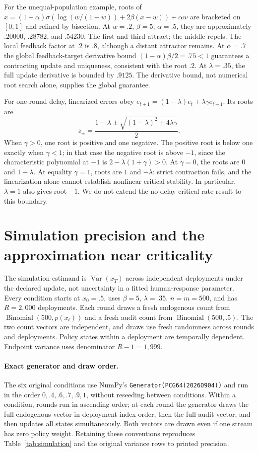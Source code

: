 For the unequal-population example, roots of $x=(1-\alpha)\sigma(\log(w/(1-w))+2\beta(x-w))+\alpha w$ are bracketed on $[0,1]$ and refined by bisection. At $w=.2$, $\beta=5$, $\alpha=.5$, they are approximately $.20000$, $.28782$, and $.54230$. The first and third attract; the middle repels. The local feedback factor at $.2$ is $.8$, although a distant attractor remains. At $\alpha=.7$ the global feedback-target derivative bound $(1-\alpha)\beta/2=.75<1$ guarantees a contracting update and uniqueness, consistent with the root $.2$. At $\lambda=.35$, the full update derivative is bounded by $.9125$. The derivative bound, not numerical root search alone, supplies the global guarantee.

For one-round delay, linearized errors obey $e_{t+1}=(1-\lambda)e_t+\lambda\gamma e_{t-1}$. Its roots are
\[
z_\pm=\frac{1-\lambda\pm\sqrt{(1-\lambda)^2+4\lambda\gamma}}{2}.
\]
When $\gamma>0$, one root is positive and one negative. The positive root is below one exactly when $\gamma<1$; in that case the negative root is above $-1$, since the characteristic polynomial at $-1$ is $2-\lambda(1+\gamma)>0$. At $\gamma=0$, the roots are $0$ and $1-\lambda$. At equality $\gamma=1$, roots are $1$ and $-\lambda$: strict contraction fails, and the linearization alone cannot establish nonlinear critical stability. In particular, $\lambda=1$ also gives root $-1$. We do not extend the no-delay critical-rate result to this boundary.

\section{Simulation precision and the approximation near criticality}\label{app:simulation}
The simulation estimand is $\operatorname{Var}(x_T)$ across independent deployments under the declared update, not uncertainty in a fitted human-response parameter. Every condition starts at $x_0=.5$, uses $\beta=5$, $\lambda=.35$, $n=m=500$, and has $R=2{,}000$ deployments. Each round draws a fresh endogenous count from $\operatorname{Binomial}(500,p(x_t))$ and a fresh audit count from $\operatorname{Binomial}(500,.5)$. The two count vectors are independent, and draws use fresh randomness across rounds and deployments. Policy states within a deployment are temporally dependent. Endpoint variance uses denominator $R-1=1{,}999$.

\paragraph{Exact generator and draw order.}
The six original conditions use NumPy's \texttt{Generator(PCG64(20260904))} and run in the order $0,.4,.6,.7,.9,1$, without reseeding between conditions. Within a condition, rounds run in ascending order; at each round the generator draws the full endogenous vector in deployment-index order, then the full audit vector, and then updates all states simultaneously. Both vectors are drawn even if one stream has zero policy weight. Retaining these conventions reproduces Table~\ref{tab:simulation} and the original variance rows to printed precision.

